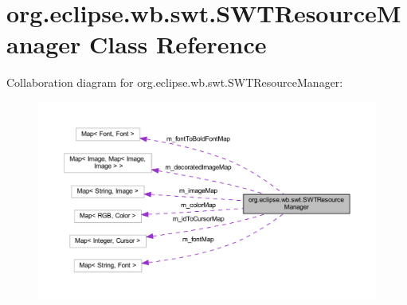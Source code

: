 \hypertarget{classorg_1_1eclipse_1_1wb_1_1swt_1_1_s_w_t_resource_manager}{\section{org.\-eclipse.\-wb.\-swt.\-S\-W\-T\-Resource\-Manager Class Reference}
\label{classorg_1_1eclipse_1_1wb_1_1swt_1_1_s_w_t_resource_manager}
}


Collaboration diagram for org.\-eclipse.\-wb.\-swt.\-S\-W\-T\-Resource\-Manager\-:
\nopagebreak
\begin{figure}[H]
\begin{center}
\leavevmode
\includegraphics[width=350pt]{classorg_1_1eclipse_1_1wb_1_1swt_1_1_s_w_t_resource_manager__coll__graph}
\end{center}
\end{figure}
